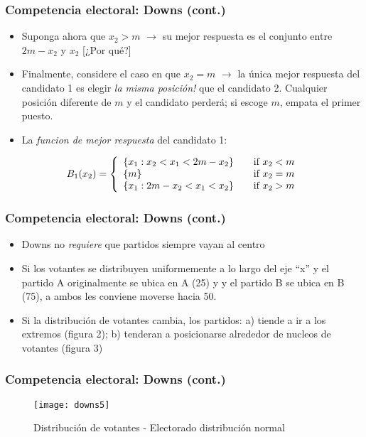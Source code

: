 \documentclass[14pt,aspectratio=169]{beamer}
\begin{document}
\begin{frame}
\frametitle{Competencia electoral: Downs (cont.)}
\begin{itemize}
\item Suponga ahora que $x_{2}>m$ $\longrightarrow$ su mejor respuesta es el
  conjunto entre $2m-x_{2}$ y $x_{2}$ [¿Por qué?]
\item Finalmente, considere el caso en que $x_{2}=m$ $\longrightarrow$
  la única mejor respuesta del candidato 1 es elegir \textit{la misma
    posición!} que el candidato 2. Cualquier posición diferente de $m$
  y el candidato perderá; si escoge $m$, empata el primer puesto.
\item La \textit{funcion de mejor respuesta} del candidato 1:
\end{itemize} \medskip
\[B_{1}(x_{2}) = \left\{
\begin{array}{l l}
  \left\{x_{1}:x_{2}<x_{1}<2m-x_{2}\right\} & \quad \mbox{if
    $x_{2}<m$}\\
\left\{m\right\} & \quad \mbox{if $x_{2}=m$}\\
\left\{x_{1}:2m-x_{2}<x_{1}<x_{2}\right\} & \quad \mbox{if
    $x_{2}>m$} \\
\end{array} \right. \]
\end{frame}

\begin{frame}\frametitle{Competencia electoral: Downs (cont.)}
  \begin{itemize}
\item Downs no \textit{requiere} que partidos siempre vayan al centro
  \item Si los votantes se distribuyen uniformemente a lo largo del
    eje ``x'' y el partido A originalmente se ubica en A (25) y y el
    partido B se ubica en B (75), a ambos les conviene moverse hacia
    50.
    \item Si la distribución de votantes cambia, los partidos: a)
      tiende a ir a los extremos
      (figura 2); b) tenderan a posicionarse
      alrededor de nucleos de votantes (figura 3) 
    \end{itemize}
  \end{frame}


  \begin{frame}\frametitle{Competencia electoral: Downs (cont.)}
  \begin{figure}[htbp] \vspace{-1cm}
  \centering
  \texttt{[image: downs5]} \vspace{-1cm}
  \caption{Distribución de votantes - Electorado distribución normal}
  \label{fig:3}
\end{figure}
    \end{frame}
\end{document}
